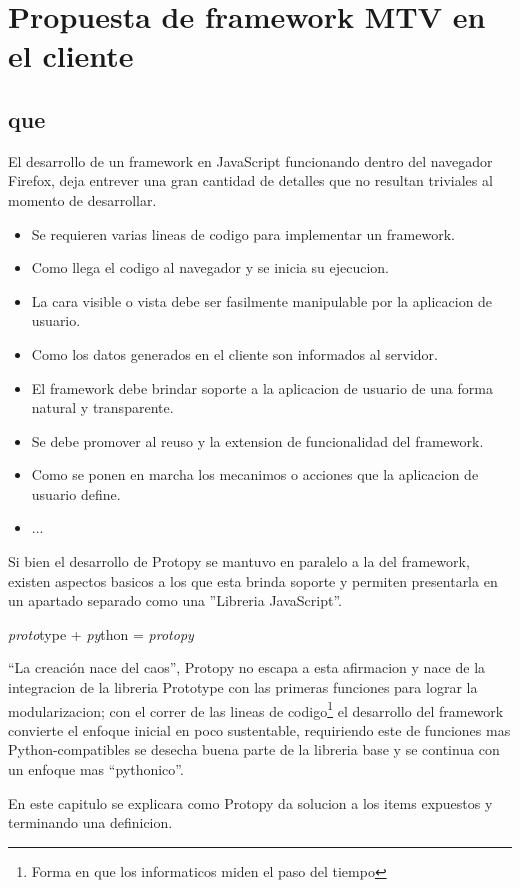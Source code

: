 \chapter{Propuesta de framework MTV en el cliente}

\section{que}
El desarrollo de un framework en JavaScript funcionando dentro del navegador
Firefox, deja entrever una gran cantidad de detalles que no resultan triviales
al momento de desarrollar.
\begin{itemize}
 \item Se requieren varias lineas de codigo para implementar un framework.
 \item Como llega el codigo al navegador y se inicia su ejecucion.
 \item La cara visible o vista debe ser fasilmente manipulable por la aplicacion
de usuario.
 \item Como los datos generados en el cliente son informados al servidor.
 \item El framework debe brindar soporte a la aplicacion de usuario de una forma
natural y transparente.
 \item Se debe promover al reuso y la extension de funcionalidad del framework.
 \item Como se ponen en marcha los mecanimos o acciones que la aplicacion de
usuario define.
 \item ...
\end{itemize} 
Si bien el desarrollo de Protopy se mantuvo en paralelo a la del
framework, existen aspectos basicos a los que esta brinda soporte y permiten
presentarla en un apartado separado como una ''Libreria JavaScript''.

\textit{proto}type + \textit{py}thon = \textit{protopy}

``La creación nace del caos'', Protopy no escapa a esta afirmacion y nace de la
integracion de la libreria Prototype con las primeras funciones para lograr
la modularizacion; con el correr de las lineas de codigo\footnote{Forma en que
los informaticos miden el paso del tiempo} el desarrollo del framework convierte
el enfoque inicial en poco sustentable, requiriendo este de funciones mas
Python-compatibles se desecha buena parte de la libreria base y se continua con
un enfoque mas ``pythonico''.

En este capitulo se explicara como Protopy da solucion a los items expuestos y
terminando una definicion.

